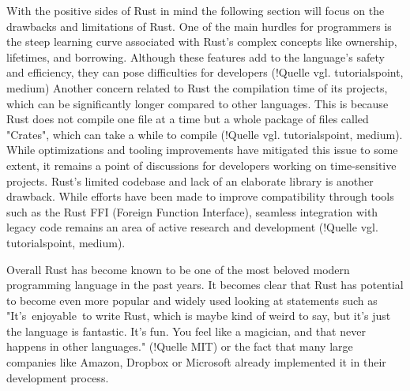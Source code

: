 With the positive sides of Rust in mind the following section will focus on the drawbacks and limitations of Rust. One of the main hurdles for programmers is the steep learning curve associated with Rust's complex concepts like ownership, lifetimes, and borrowing. Although these features add to the language's safety and efficiency, they can pose difficulties for developers (!Quelle vgl. tutorialspoint, medium)
Another concern related to Rust the compilation time of its projects, which can be significantly longer compared to other languages. This is because Rust does not compile one file at a time but a whole package of files called "Crates", which can take a while to compile (!Quelle vgl. tutorialspoint, medium). While optimizations and tooling improvements have mitigated this issue to some extent, it remains a point of discussions for developers working on time-sensitive projects.
Rust's limited codebase and lack of an elaborate library is another drawback. While efforts have been made to improve compatibility through tools such as the Rust FFI (Foreign Function Interface), seamless integration with legacy code remains an area of active research and development (!Quelle vgl. tutorialspoint, medium).

Overall Rust has become known to be one of the most beloved modern programming language in the past years. It becomes clear that Rust has potential to become even more popular and widely used looking at statements such as 
"It’s enjoyable to write Rust, which is maybe kind of weird to say, but it’s just the language is fantastic. It’s fun. You feel like a magician, and that never happens in other languages." (!Quelle MIT) or the fact that many large companies like Amazon, Dropbox or Microsoft already implemented it in their development process.
